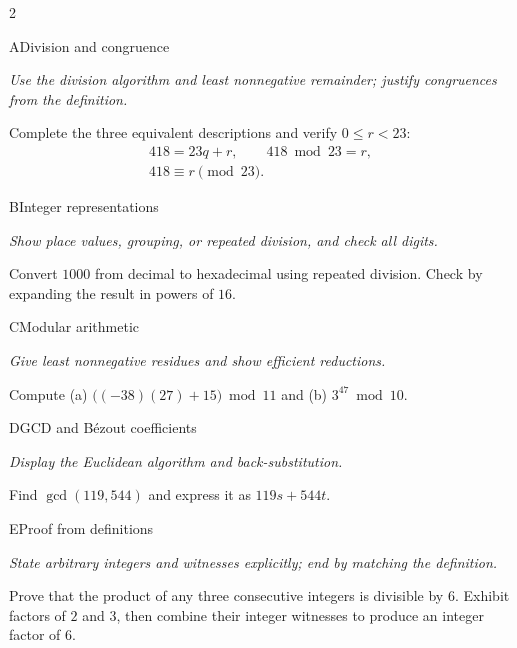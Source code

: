\documentclass[9pt]{extarticle}
\begin{document}
\begin{multicols}{2}
\begin{CoreProblem}{A}{Division and congruence}
{\scriptsize\textit{Use the division algorithm and least nonnegative remainder; justify congruences from the definition.}\par}
Complete the three equivalent descriptions and verify $0\le r<23$:
\[
\begin{gathered}
418=23q+r,\qquad 418\bmod 23=r,\\
418\equiv r\pmod{23}.
\end{gathered}
\]
\end{CoreProblem}
\begin{CoreProblem}{B}{Integer representations}
{\scriptsize\textit{Show place values, grouping, or repeated division, and check all digits.}\par}
Convert $1000$ from decimal to hexadecimal using repeated division. Check by
expanding the result in powers of $16$.
\end{CoreProblem}
\begin{CoreProblem}{C}{Modular arithmetic}
{\scriptsize\textit{Give least nonnegative residues and show efficient reductions.}\par}
Compute (a) $\bigl((-38)(27)+15\bigr)\bmod11$ and
(b) $3^{47}\bmod10$.
\end{CoreProblem}
\columnbreak
\begin{CoreProblem}{D}{GCD and B\'ezout coefficients}
{\scriptsize\textit{Display the Euclidean algorithm and back-substitution.}\par}
Find $\gcd(119,544)$ and express it as $119s+544t$.
\end{CoreProblem}
\begin{CoreProblem}{E}{Proof from definitions}
{\scriptsize\textit{State arbitrary integers and witnesses explicitly; end by matching the definition.}\par}
Prove that the product of any three consecutive integers is divisible by $6$.
Exhibit factors of $2$ and $3$, then combine their integer witnesses to
produce an integer factor of $6$.
\end{CoreProblem}
\end{multicols}
\CoreWorkArea
\FormBreak
{}
\end{document}
